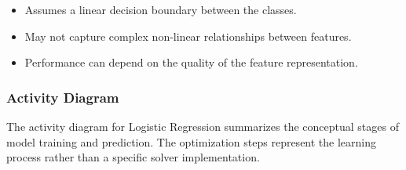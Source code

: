 \documentclass[12pt,a4paper]{report}
\begin{document}
\begin{itemize}
    \item Assumes a linear decision boundary between the classes.
    \item May not capture complex non-linear relationships between features.
    \item Performance can depend on the quality of the feature representation.
\end{itemize}

\subsubsection*{Activity Diagram}

The activity diagram for Logistic Regression summarizes the conceptual stages of model training and prediction. The optimization steps represent the learning process rather than a specific solver implementation.
\end{document}

